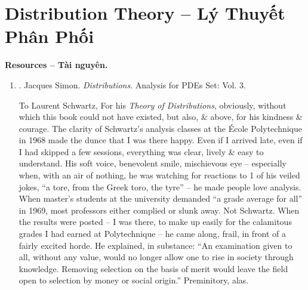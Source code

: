 \documentclass{article}
\begin{document}

\section{Distribution Theory -- Lý Thuyết Phân Phối}
\textbf{\textsf{Resources -- Tài nguyên.}}
\begin{enumerate}
	\item \cite{Simon2022}. {\sc Jacques Simon}. {\it Distributions}. Analysis for PDEs Set: Vol. 3.
	
	To {\sc Laurent Schwartz}, For his {\it Theory of Distributions}, obviously, without which this book could not have existed, but also, \& above, for his kindness \& courage. The clarity of {\sc Schwartz}'s analysis classes at the \'Ecole Polytechnique in 1968 made the dunce that I was there happy. Even if I arrived late, even if I had skipped a few sessions, everything was clear, lively \& easy to understand. His soft voice, benevolent smile, mischievous eye -- especially when, with an air of nothing, he was watching for reactions to 1 of his veiled jokes, ``a tore, from the Greek toro, the tyre'' -- he made people love analysis. When master's students at the university demanded ``a grade average for all'' in 1969, most professors either complied or slunk away. Not {\sc Schwartz}. When the results were posted -- I was there, to make up easily for the calamitous grades I had earned at Polytechnique -- he came along, frail, in front of a fairly excited horde. He explained, in substance: ``An examination given to all, without any value, would no longer allow one to rise in society through knowledge. Removing selection on the basis of merit would leave the field open to selection by money or social origin.'' Preminitory, alas.
	

\end{enumerate}
\end{document}
